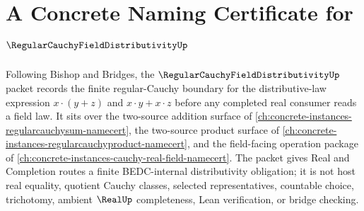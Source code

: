 \chapter{A Concrete Naming Certificate for $\RegularCauchyFieldDistributivityUp$}
\label{ch:concrete-instances-regular-cauchy-field-distributivity-namecert}

Following Bishop and Bridges, the $\RegularCauchyFieldDistributivityUp$ packet records the finite regular-Cauchy boundary for the distributive-law expression $x\cdot(y+z)$ and $x\cdot y+x\cdot z$ before any completed real consumer reads a field law. It sits over the two-source addition surface of \autoref{ch:concrete-instances-regularcauchysum-namecert}, the two-source product surface of \autoref{ch:concrete-instances-regularcauchyproduct-namecert}, and the field-facing operation package of \autoref{ch:concrete-instances-cauchy-real-field-namecert}. The packet gives Real and Completion routes a finite BEDC-internal distributivity obligation; it is not host real equality, quotient Cauchy classes, selected representatives, countable choice, trichotomy, ambient $\RealUp$ completeness, Lean verification, or bridge checking.


